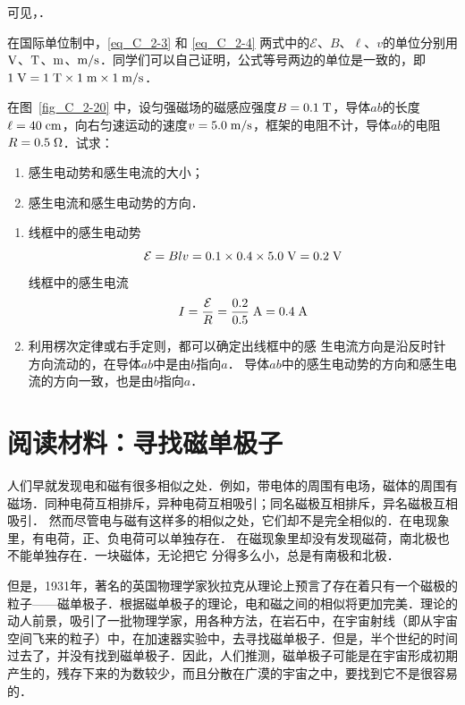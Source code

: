 可见，．

在国际单位制中，\eqref{eq_C_2-3} 和 \eqref{eq_C_2-4} 两式中的$\mathcal{E}$、$B$、$\ell$、$v$的单位分别用$\text{V}$、$\text{T}$、$\text{m}$、$\text{m}/\text{s}$．同学们可以自己证明，公式等号两边的单位是一致的，即$1 \;\text{V}=1\;\text{T} \times1\;\text{m}\times1\;\text{m}/\text{s}$．

\begin{example}
    在图~\ref{fig_C_2-20} 中，设匀强磁场的磁感应强度$B=0.1\;\text{T}$，导体$ab$的长度$\ell=40\;\text{cm}$，向右匀速运动的速度$v=5.0\;\text{m}/\text{s}$，框架的电阻不计，导体$ab$的电阻$R=0.5\;\Omega$．试求：
    \begin{enumerate}
        \item 感生电动势和感生电流的大小；
        \item 感生电流和感生电动势的方向．
    \end{enumerate}
\end{example}

\begin{solution}
\begin{enumerate}
    \item 线框中的感生电动势
\[\mathcal{E}=Blv=0.1\times0.4\times5.0 \;\text{V} =0.2 \;\text{V} \]    
线框中的感生电流
\[I=\frac{\mathcal{E}}{R}=\frac{0.2}{0.5} \;\text{A} =0.4\;\text{A} \]

\item 利用楞次定律或右手定则，都可以确定出线框中的感
生电流方向是沿反时针方向流动的，在导体$ab$中是由$b$指向$a$． 导体$ab$中的感生电动势的方向和感生电流的方向一致，也是由$b$指向$a$．
\end{enumerate}
\end{solution}
   
\section*{阅读材料：寻找磁单极子}
人们早就发现电和磁有很多相似之处．例如，带电体的周围有电场，磁体的周围有磁场．同种电荷互相排斥，异种电荷互相吸引；同名磁极互相排斥，异名磁极互相吸引．
然而尽管电与磁有这样多的相似之处，它们却不是完全相似的．在电现象里，有电荷，正、负电荷可以单独存在．
在磁现象里却没有发现磁荷，南北极也不能单独存在．一块磁体，无论把它
分得多么小，总是有南极和北极．

但是，1931年，著名的英国物理学家狄拉克从理论上预言了存在着只有一个磁极的粒子——磁单极子．根据磁单极子的理论，电和磁之间的相似将更加完美．理论的动人前景，吸引了一批物理学家，用各种方法，在岩石中，在宇宙射线（即从宇宙空间飞来的粒子）中，在加速器实验中，去寻找磁单极子．但是，半个世纪的时间过去了，并没有找到磁单极子．因此，人们推测，磁单极子可能是在宇宙形成初期产生的，残存下来的为数较少，而且分散在广漠的宇宙之中，要找到它不是很容易的．


